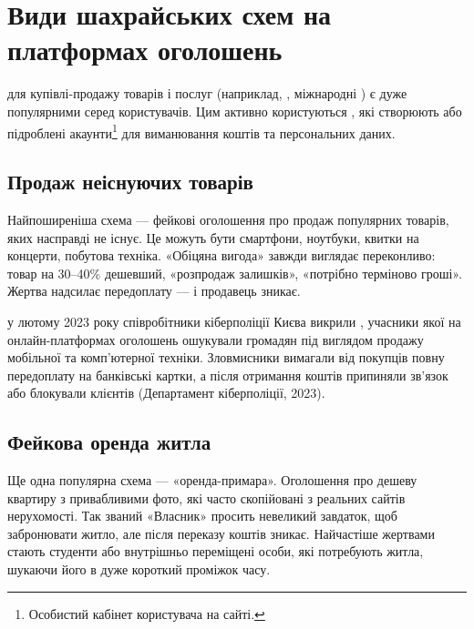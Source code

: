 ﻿%

\chapter{Види шахрайських схем на платформах оголошень}

 для купівлі-продажу товарів і послуг (наприклад, , міжнародні ) є дуже популярними серед користувачів. Цим активно користуються , які створюють  або підроблені акаунти\footnote{Особистий кабінет користувача на сайті.} для виманювання коштів та персональних даних. 


\vspace{0.3cm}
\section{Продаж неіснуючих товарів}

Найпоширеніша схема — фейкові оголошення про продаж популярних товарів, яких насправді не існує. Це можуть бути смартфони, ноутбуки, квитки на концерти, побутова техніка. «Обіцяна вигода» завжди виглядає переконливо: товар на 30–40\% дешевший, «розпродаж залишків», «потрібно терміново гроші». Жертва надсилає передоплату — і продавець зникає.

 у лютому 2023 року співробітники кіберполіції Києва викрили , учасники якої на онлайн-платформах оголошень ошукували громадян під виглядом продажу мобільної та комп'ютерної техніки. Зловмисники вимагали від покупців повну передоплату на банківські картки, а після отримання коштів припиняли зв'язок або блокували клієнтів (Департамент кіберполіції, 2023).

\vspace{0.3cm}

\section{Фейкова оренда житла}

Ще одна популярна схема — «оренда-примара». Оголошення про дешеву квартиру з привабливими фото, які часто скопійовані з реальних сайтів нерухомості. Так званий «Власник» просить невеликий завдаток, щоб забронювати житло, але після переказу коштів зникає. Найчастіше жертвами стають студенти або внутрішньо переміщені особи, які потребують житла, шукаючи його в дуже короткий проміжок часу.

